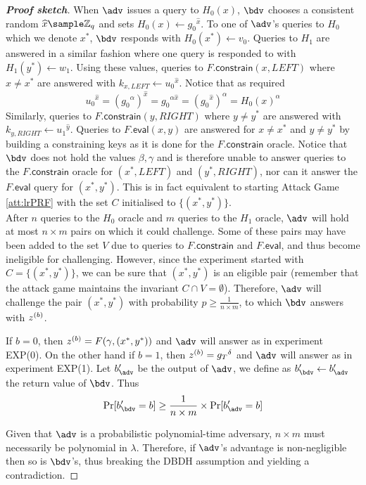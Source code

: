 \begin{proof}[\textbf{Proof sketch}]
			When $\adv$ issues a query to $H_0(x)$, $\bdv$ chooses a consistent random $\widehat x \sample \mathbb{Z}_q$ and sets $H_0(x) \leftarrow {g_0}^{\widehat x}$. To one of $\adv$'s queries to $H_0$ which we denote $x^*$, $\bdv$ responds with $H_0(x^*) \leftarrow v_0$. Queries to $H_1$ are answered in a similar fashion where one query is responded to with $H_1(y^*) \leftarrow w_1$. Using these values, queries to $F.\mathsf{constrain}(x,LEFT)$ where $x\neq x^*$ are answered with $k_{x,LEFT} \leftarrow  {u_0}^{\widehat x}$. Notice that as required
				$$ {u_0}^{\widehat x} = ({g_0}^\alpha)^{\widehat x} = {g_0}^{\alpha \widehat x} = ({g_0}^{\widehat x})^{\alpha} = H_0(x)^\alpha$$
			Similarly, queries to $F.\mathsf{constrain}(y,RIGHT)$ where $y\neq y^*$ are answered with $k_{y,RIGHT} \leftarrow  {u_1}^{\widehat y}$. Queries to $F.\mathsf{eval}(x,y)$ are answered for $x \neq x^*$ and $y \neq y^*$ by building a constraining keys as it is done for the $F.\mathsf{constrain}$ oracle. Notice that $\bdv$ does not hold the values $\beta,\gamma$ and is therefore unable to answer queries to the $F.\mathsf{constrain}$ oracle for $(x^*, LEFT)$ and $(y^*, RIGHT)$, nor can it answer the $F.\mathsf{eval}$ query for $(x^*,y^*)$. This is in fact equivalent to starting Attack Game \autoref{att:lrPRF} with the set $C$ initialised to $\{(x^*,y^*)\}$. \\
			
			After $n$ queries to the $H_0$ oracle and $m$ queries to the $H_1$ oracle, $\adv$ will hold at most $n \times m$ pairs on which it could challenge.	 Some of these pairs may have been added to the set $V$ due to queries to $F.\mathsf{constrain}$ and $F.\mathsf{eval}$, and thus become ineligible for challenging. However, since the experiment started with $C = \{(x^*,y^*)\}$, we can be sure that $(x^*,y^*)$ is an eligible pair (remember that the attack game maintains the invariant $C \cap V = \emptyset$). Therefore, $\adv$ will challenge the pair $(x^*,y^*)$ with probability $p \geq \frac{1}{n\times m}$, to which $\bdv$ answers with $z^{(b)}$. 
			
			If $b=0$, then $z^{(b)} = F(\gamma, (x^*, y^*))$ and $\adv$ will answer as in experiment EXP(0). On the other hand if $b=1$, then $z^{(b)} = {g_T}^{\delta}$ and $\adv$ will answer as in experiment EXP(1). Let $b'_\adv$ be the output of $\adv$, we define as $b'_\bdv \leftarrow b'_\adv$ the return value of $\bdv$. Thus
			\begin{equation}
				\Pr[b'_\bdv = b] \geq \frac{1}{n \times m} \times \Pr[b'_\adv = b]
			\end{equation}
			
			Given that $\adv$ is a probabilistic polynomial-time adversary, $n \times m$ must necessarily be polynomial in $\lambda$. Therefore, if $\adv$'s advantage is non-negligible then so is $\bdv$'s, thus breaking the DBDH assumption and yielding a contradiction.
		\end{proof}
		
